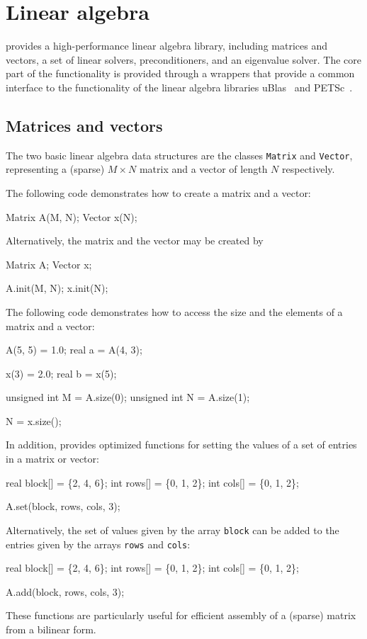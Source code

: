 \chapter{Linear algebra}

\dolfin{} provides a high-performance linear algebra library,
including matrices and vectors, a set of linear solvers,
preconditioners, and an eigenvalue solver. The core part of the
functionality is provided through a wrappers that provide a common
interface to the functionality of the linear algebra libraries
uBlas~\cite{www:ublas} and PETSc~\cite{www:petsc}.

\section{Matrices and vectors}

The two basic linear algebra data structures are the classes
\texttt{Matrix} and \texttt{Vector}, representing a (sparse) $M\times
N$ matrix and a vector of length $N$ respectively.

The following code demonstrates how to create a matrix and a vector:
\begin{code}
  Matrix A(M, N);
  Vector x(N);
\end{code}
Alternatively, the matrix and the vector may be created by
\begin{code}
  Matrix A;
  Vector x;

  A.init(M, N);
  x.init(N);
\end{code}

The following code demonstrates how to access the size and the
elements of a matrix and a vector:
\begin{code}
  A(5, 5) = 1.0;
  real a = A(4, 3);

  x(3) = 2.0;
  real b = x(5);

  unsigned int M = A.size(0);
  unsigned int N = A.size(1);

  N = x.size();
\end{code}

In addition, \dolfin{} provides optimized functions for setting the
values of a set of entries in a matrix or vector:
\begin{code}
  real block[] = \{2, 4, 6\};
  int rows[] = \{0, 1, 2\};
  int cols[] = \{0, 1, 2\};
  
  A.set(block, rows, cols, 3);
\end{code}
Alternatively, the set of values given by the array \texttt{block} can
be added to the entries given by the arrays \texttt{rows} and
\texttt{cols}:
\begin{code}
  real block[] = \{2, 4, 6\};
  int rows[] = \{0, 1, 2\};
  int cols[] = \{0, 1, 2\};
  
  A.add(block, rows, cols, 3);
\end{code}
These functions are particularly useful for efficient assembly of a (sparse)
matrix from a bilinear form.

